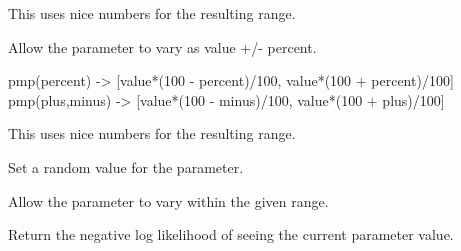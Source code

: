 \documentclass[letterpaper,10pt,english]{sphinxmanual}
\begin{document}
\begin{fulllineitems}
\begin{fulllineitems}
This uses nice numbers for the resulting range.

\end{fulllineitems}


\begin{fulllineitems}
\label{api/mystic.parameter:refl1d.mystic.parameter.Reference.pmp}
Allow the parameter to vary as value +/- percent.

pmp(percent) -\textgreater{} {[}value*(100 - percent)/100, value*(100 + percent)/100{]}
pmp(plus,minus) -\textgreater{} {[}value*(100 - minus)/100, value*(100 + plus)/100{]}

This uses nice numbers for the resulting range.

\end{fulllineitems}


\begin{fulllineitems}
\label{api/mystic.parameter:refl1d.mystic.parameter.Reference.rand}
Set a random value for the parameter.

\end{fulllineitems}


\begin{fulllineitems}
\label{api/mystic.parameter:refl1d.mystic.parameter.Reference.range}
Allow the parameter to vary within the given range.

\end{fulllineitems}


\begin{fulllineitems}
\label{api/mystic.parameter:refl1d.mystic.parameter.Reference.residual}
Return the negative log likelihood of seeing the current parameter value.

\end{fulllineitems}



\end{fulllineitems}
\end{document}
